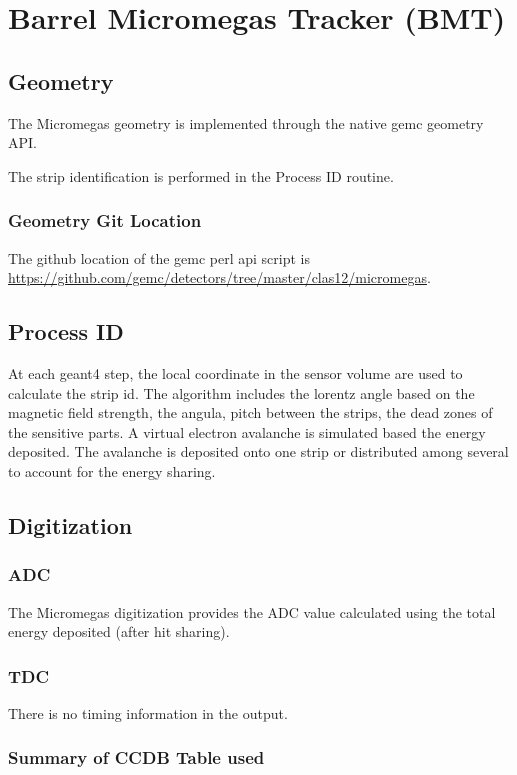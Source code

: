 \section{Barrel Micromegas Tracker (BMT)}

\subsection{Geometry}

The Micromegas geometry is implemented through the native gemc geometry API.


The strip identification is performed in the Process ID routine.

\subsubsection{Geometry Git Location}
The github location of the gemc perl api script is \url{https://github.com/gemc/detectors/tree/master/clas12/micromegas}.


\subsection{Process ID}
At each geant4 step, the local coordinate in the sensor volume are used to calculate the strip id.
The algorithm includes the lorentz angle based on the magnetic field strength, the angula, pitch between the strips,
the dead zones of the sensitive parts. A virtual electron avalanche is simulated based the energy deposited. The avalanche
is deposited onto one strip or distributed among several to account for the energy sharing.



\subsection{Digitization}

\subsubsection{ADC}
The Micromegas digitization provides the ADC value calculated using the total energy deposited (after hit sharing).


\subsubsection{TDC}
There is no timing information in the output.

\subsubsection{Summary of CCDB Table used}

